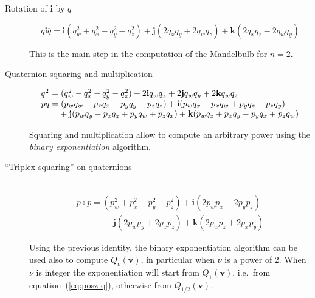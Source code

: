 \documentclass{article}
\let\vec\mathbf
\let\bar\overline
\newcommand{\mathnewlineeq}[1][\quad]{\\\phantom{#1 = }}
\begin{document}
\begin{description}
\item[Rotation of $\vec{i}$ by $q$]
\begin{equation*}
q\vec{i}\bar q =
  \vec{i}(q_w^2+q_x^2-q_y^2-q_z^2) + \vec{j} (2q_x q_y + 2q_w q_z)
  + \vec{k} (2 q_x q_z - 2 q_w q_y)
\end{equation*}

\noindent This is the main step in the computation of the Mandelbulb
for $n=2$.

\bigskip
\item[Quaternion squaring and multiplication]
\begin{equation*}
\begin{array}{l}
\hbox to 0pt{$q^2\hss$}\phantom{p q} =
  (q_w^2-q_x^2-q_y^2-q_z^2) + 2 \vec{i} q_w q_x + 2 \vec{j} q_w q_y
  + 2 \vec{k} q_w q_z\\
p q =       (p_w q_w - p_x q_x - p_y q_y - p_z q_z)
  + \vec{i} (p_w q_x + p_x q_w + p_y q_z - p_z q_y) \mathnewlineeq[p q]
  + \vec{j} (p_w q_y - p_x q_z + p_y q_w + p_z q_x)
  + \vec{k} (p_w q_z + p_x q_y - p_y q_x + p_z q_w)
\end{array}
\end{equation*}

\noindent
Squaring and multiplication allow to compute an arbitrary power using
the \emph{binary exponentiation} algorithm.

\bigskip
\item[``Triplex squaring'' on quaternions] ~\\
\begin{equation*}
\begin{array}{l}
p \circ p =
    (p_w^2 + p_x^2 - p_y^2 - p_z^2) + \vec{i} (2 p_w p_x - 2 p_y p_z)
\mathnewlineeq[p \circ p]
  + \vec{j} (2 p_w p_y + 2 p_x p_z) + \vec{k} (2 p_w p_z + 2 p_x p_y)
\end{array}
\end{equation*}

Using the previous identity, the binary exponentiation algorithm can
be used also to compute $Q_\nu(\vec{v})$, in particular when $\nu$ is a
power of 2.  When $\nu$ is integer the exponentiation will start
from $Q_1(\vec{v})$, i.e.~from equation~(\ref{eq:posz-q}),
otherwise from $Q_{1/2}(\vec{v})$.


\end{description}
\end{document}
